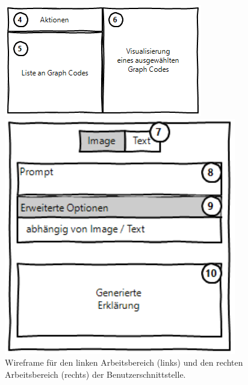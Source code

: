 \begin{figure}[htb]
    \centering
    \begin{minipage}[b]{.5\textwidth}
        \centering
        \includegraphics[width=\textwidth]{chapter/chapter_3/wireframe-stage-2.png}
    \end{minipage}%
    \begin{minipage}[t]{.5\textwidth}
        \centering
        \includegraphics[width=0.9\textwidth]{chapter/chapter_3/wireframe-stage-3.png}
    \end{minipage}
    \caption{Wireframe für den linken Arbeitsbereich (links) und den rechten Arbeitsbereich (rechts) der Benutzerschnittstelle.}
    \label{sec3:model:par:wireframe:fig:stage-2+3}
\end{figure}

